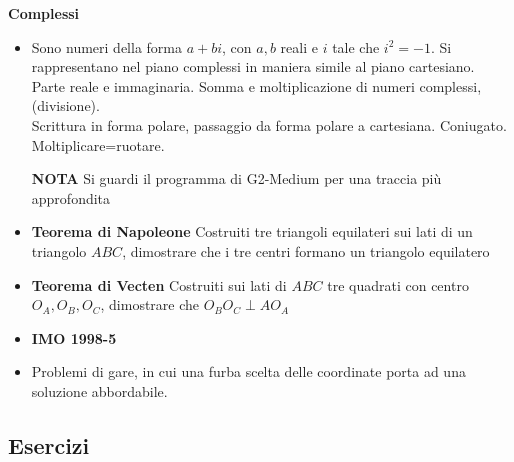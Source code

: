 \textbf{Complessi}\\
\begin{itemize}
\item Sono numeri della forma $a+bi$, con $a,b$ reali e $i$ tale che $i^2=-1$. Si rappresentano nel piano complessi in maniera simile al piano cartesiano. Parte reale e immaginaria. Somma e moltiplicazione di numeri complessi, (divisione).\\
Scrittura in forma polare, passaggio da forma polare a cartesiana. Coniugato. Moltiplicare=ruotare. 

\textbf{NOTA} Si guardi il programma di G2-Medium per una traccia più approfondita

\item \textbf{Teorema di Napoleone} Costruiti tre triangoli equilateri sui lati di un triangolo $ABC$, dimostrare che i tre centri formano un triangolo equilatero

\item \textbf{Teorema di Vecten} Costruiti sui lati di $ABC$ tre quadrati con centro $O_A,O_B,O_C$, dimostrare che $O_BO_C\perp AO_A$

\item \textbf{IMO 1998-5}


\item Problemi di gare, in cui una furba scelta delle coordinate porta ad una soluzione abbordabile.
\end{itemize}

\subsection{Esercizi}

